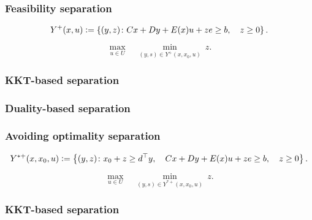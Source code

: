 
\subsubsection{Feasibility separation}



\begin{equation*}
    Y^{+}(x,u) \mathrel{{\mathop:}{=}} 
    \left\{
        (y,z)
    \colon
        Cx + Dy + E(x)u + ze \ge b, \quad
        z \ge 0
    \right\}.
\end{equation*}

\begin{equation*}
    \max_{u\in U} \quad \min_{(y,s)\in Y^{+}(x,x_0,u)} \ z.
\end{equation*}


\subsubsection*{KKT-based separation}


\subsubsection*{Duality-based separation}


\subsubsection{Avoiding optimality separation}


\begin{equation*}
    Y^{*+}(x,x_0,u) \mathrel{{\mathop:}{=}} 
    \left\{
        (y,z)
    \colon
        x_0 + z \ge d^\top y, \quad
        Cx + Dy + E(x)u + ze \ge b, \quad
        z \ge 0
    \right\}.
\end{equation*}

\begin{equation*}
    \max_{u\in U} \quad \min_{(y,s)\in Y^{*+}(x,x_0,u)} \ z.
\end{equation*}

\subsubsection*{KKT-based separation}

